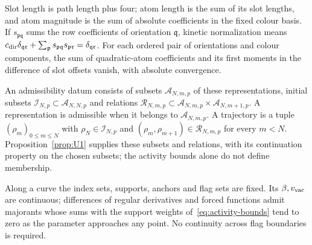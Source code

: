 \begin{definition}
\begin{equation}
\end{equation}
Slot length is path length plus four; atom length is the sum of its slot lengths, and atom magnitude is the sum of absolute coefficients in the fixed colour basis. If $s_{\mathfrak p\mathfrak q}$ sums the row coefficients of orientation $\mathfrak q$, kinetic normalization means $c_{\rm dir}\delta_{\mathfrak q\mathfrak r}+\sum_{\mathfrak p}s_{\mathfrak p\mathfrak q}s_{\mathfrak p\mathfrak r}=\delta_{\mathfrak q\mathfrak r}$. For each ordered pair of orientations and colour components, the sum of quadratic-atom coefficients and its first moments in the difference of slot offsets vanish, with absolute convergence.

An admissibility datum consists of subsets $\mathcal A_{N,m,p}$ of these representations, initial subsets $\mathcal I_{N,p}\subset\mathcal A_{N,N,p}$ and relations $\mathcal R_{N,m,p}\subset\mathcal A_{N,m,p}\times\mathcal A_{N,m+1,p}$. A representation is admissible when it belongs to $\mathcal A_{N,m,p}$. A trajectory is a tuple $(\rho_m)_{0\le m\le N}$ with $\rho_N\in\mathcal I_{N,p}$ and $(\rho_m,\rho_{m+1})\in\mathcal R_{N,m,p}$ for every $m<N$. Proposition~\ref{prop:U1} supplies these subsets and relations, with its continuation property on the chosen subsets; the activity bounds alone do not define membership.

Along a curve the index sets, supports, anchors and flag sets are fixed. Its $\beta,v_{\rm vac}$ are continuous; differences of regular derivatives and forced functions admit majorants whose sums with the support weights of~\eqref{eq:activity-bounds} tend to zero as the parameter approaches any point. No continuity across flag boundaries is required.
\end{definition}

